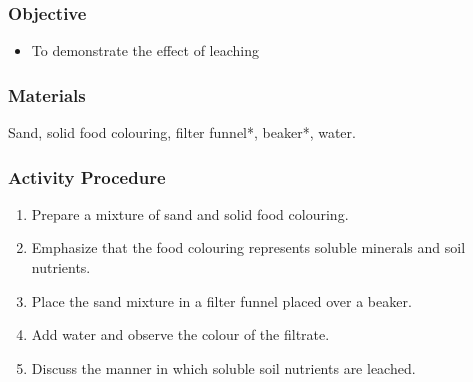 \subsubsection{Objective}
\begin{itemize}
\item{To demonstrate the effect of leaching}
\end{itemize}

\subsubsection{Materials}
Sand, solid food colouring, filter funnel*, beaker*, water.

\subsubsection{Activity Procedure}
\begin{enumerate}
\item{Prepare a mixture of sand and solid food colouring.}
\item{Emphasize that the food colouring represents soluble minerals and soil nutrients.}
\item{Place the sand mixture in a filter funnel placed over a beaker.}
\item{Add water and observe the colour of the filtrate.}
\item{Discuss the manner in which soluble soil nutrients are leached.}
\end{enumerate}